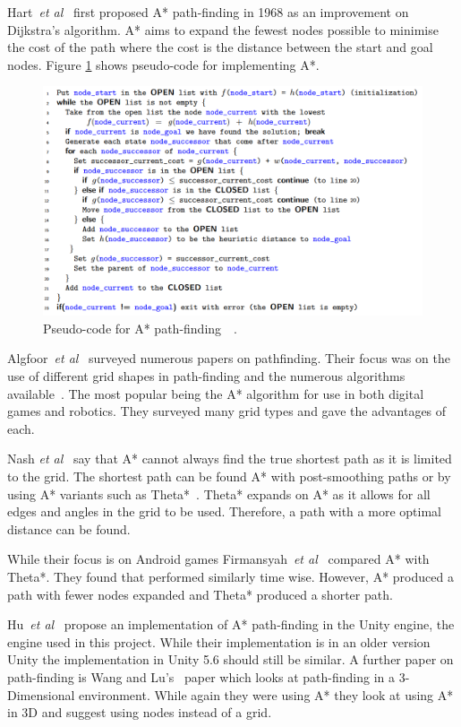 \documentclass[journal]{IEEEtran}
\begin{document}
Hart~\textit{et al}~\cite{Hart1968} first proposed A* path-finding in 1968 as an improvement on Dijkstra's algorithm. A* aims to expand the fewest nodes possible to minimise the cost of the path where the cost is the distance between the start and goal nodes. Figure \ref{A*Pseudo} shows pseudo-code for implementing A*. 

\begin{figure}[H]
	\includegraphics[width=1.0\linewidth]{APseudocode.png}
	\caption{Pseudo-code for A* path-finding~\cite{Hart1968}~\cite{pseudocode:A*}.}
	\label{A*Pseudo}
\end{figure} 

Algfoor~\textit{et al}~\cite{Algfoor2015} surveyed numerous papers on pathfinding. Their focus was on the use of different grid shapes in path-finding and the numerous algorithms available~\cite{Algfoor2015}. The most popular being the A* algorithm for use in both digital games and robotics. They surveyed many grid types and gave the advantages of each. 

Nash \textit{et al}~\cite{Nash2007} say that A* cannot always find the true shortest path as it is limited to the grid. The shortest path can be found A* with post-smoothing paths or by using A* variants such as Theta*~\cite{Nash2007, Firmansyah2016}. Theta* expands on A* as it allows for all edges and angles in the grid to be used. Therefore, a path with a more optimal distance can be found.

While their focus is on Android games Firmansyah~\textit{et al}~\cite{Firmansyah2016} compared A* with Theta*. They found that performed similarly time wise. However, A* produced a path with fewer nodes expanded and Theta* produced a shorter path. 

Hu~\textit{et al}~\cite{Hu2012} propose an implementation of A* path-finding in the Unity engine, the engine used in this project.  While their implementation is in an older version Unity the implementation in Unity 5.6 should still be similar. A further paper on path-finding is Wang and Lu's~\cite{wang2012} paper which looks at path-finding in a 3-Dimensional environment. While again they were using A* they look at using A* in 3D and suggest using nodes instead of a grid.
\end{document}
